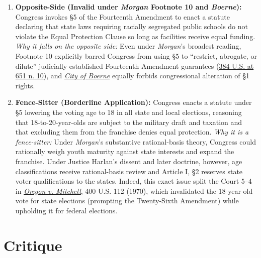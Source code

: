 \documentclass[12pt]{article}
\begin{document}
\begin{enumerate}
\item \textbf{Opposite-Side (Invalid under \textit{Morgan} Footnote 10 and \textit{Boerne}):} Congress invokes \S 5 of the Fourteenth Amendment to enact a statute declaring that state laws requiring racially segregated public schools do not violate the Equal Protection Clause so long as facilities receive equal funding. \textit{Why it falls on the opposite side:} Even under \textit{Morgan}'s broadest reading, Footnote 10 explicitly barred Congress from using \S 5 to ``restrict, abrogate, or dilute'' judicially established Fourteenth Amendment guarantees (\href{https://supreme.justia.com/cases/federal/us/384/641/}{384 U.S. at 651 n. 10}), and \href{https://supreme.justia.com/cases/federal/us/521/507/}{\textit{City of Boerne}} equally forbids congressional alteration of \S 1 rights.

\item \textbf{Fence-Sitter (Borderline Application):} Congress enacts a statute under \S 5 lowering the voting age to 18 in all state and local elections, reasoning that 18-to-20-year-olds are subject to the military draft and taxation and that excluding them from the franchise denies equal protection. \textit{Why it is a fence-sitter:} Under \textit{Morgan}'s substantive rational-basis theory, Congress could rationally weigh youth maturity against state interests and expand the franchise. Under Justice Harlan's dissent and later doctrine, however, age classifications receive rational-basis review and Article I, \S 2 reserves state voter qualifications to the states. Indeed, this exact issue split the Court 5--4 in \href{https://supreme.justia.com/cases/federal/us/400/112/}{\textit{Oregon v. Mitchell}}, 400 U.S. 112 (1970), which invalidated the 18-year-old vote for state elections (prompting the Twenty-Sixth Amendment) while upholding it for federal elections.
\end{enumerate}

\section{Critique}
\end{document}

